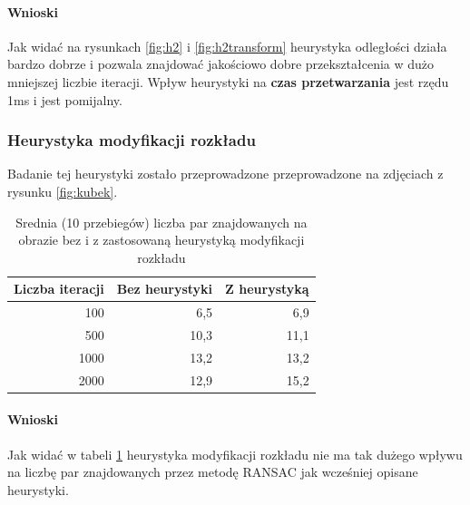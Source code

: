 \documentclass{article}
\begin{document}
	\paragraph{Wnioski}
	Jak widać na rysunkach \ref{fig:h2} i \ref{fig:h2transform} heurystyka odległości działa bardzo dobrze i pozwala znajdować jakościowo dobre przekształcenia w dużo mniejszej liczbie iteracji.
	Wpływ heurystyki na \textbf{czas przetwarzania} jest rzędu 1ms i jest pomijalny.
	
	\subsubsection{Heurystyka modyfikacji rozkładu}
	Badanie tej heurystyki zostało przeprowadzone przeprowadzone na zdjęciach z rysunku \ref{fig:kubek}.
	\begin{table}[H]
		\centering
		\caption{Srednia (10 przebiegów) liczba par znajdowanych na obrazie bez i z zastosowaną heurystyką modyfikacji rozkładu}
		\label{tab:h3}
		\begin{tabular}{|r|r|r|}
			\hline
			\multicolumn{1}{|l|}{\textbf{Liczba iteracji}} & \multicolumn{1}{l|}{\textbf{Bez heurystyki}} & \multicolumn{1}{l|}{\textbf{Z heurystyką}} \\ \hline
			100                                            & 6,5                                          & 6,9                                        \\ \hline
			500                                            & 10,3                                         & 11,1                                       \\ \hline
			1000                                           & 13,2                                         & 13,2                                       \\ \hline
			2000                                           & 12,9                                         & 15,2                                       \\ \hline
		\end{tabular}
	\end{table}
	\paragraph{Wnioski}
	Jak widać w tabeli \ref{tab:h3} heurystyka modyfikacji rozkładu nie ma tak dużego wpływu na liczbę par znajdowanych przez metodę RANSAC jak wcześniej opisane heurystyki.
\end{document}
